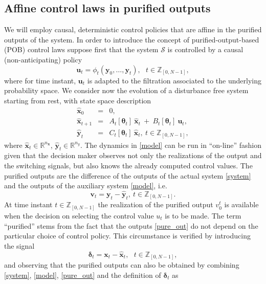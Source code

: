 \documentclass[letterpaper,11pt]{article}
\begin{document}
\subsection{Affine control laws in purified outputs}

We will employ causal, deterministic control policies that are affine in the purified outputs of the system.  In order to introduce  the concept of 
purified-output-based (POB) control laws suppose first that the system $\mathcal{S}$ is controlled by a causal (non-anticipating) policy
$$
\mathbf{u}_t = \phi_t( \mathbf{y}_0, \hdots, \mathbf{y}_t), ~~~t  \in \mathbb{Z}_{[0,N-1]},
$$
where for time instant, $\mathbf{u}_t$ is adapted to the filtration
associated to the underlying probability space. 
We consider now the evolution of a disturbance free system starting from rest, with 
state space description
\begin{eqnarray}
	\label{model}
	\nonumber
	\hat{\mathbf{x}}_0 & = & 0, \\
	\nonumber
	\hat{\mathbf{x}}_{t+1} & = &  A_t[\bm{\theta}_t] ~ \hat{\mathbf{x}}_t ~ + ~ B_t[\bm{\theta}_t] ~ \mathbf{u}_t, \\
	\hat{\mathbf{y}}_t  & = & C_t[\bm{\theta}_t] ~ \hat{\mathbf{x}}_t,  ~  t \in  \mathbb{Z}_{[0,N-1]},
\end{eqnarray}
where $ \hat{\mathbf{x}}_t \in \mathbb{R}^{n_\mathbf{x}}$, $\hat{\mathbf{y}}_t \in \mathbb{R}^{n_y}$.
The dynamics in \eqref{model} can be run in ``on-line'' fashion given that 
the decision maker observes not only the realizations of the output and the switching signals,  
but also knows the already computed control values.  
The purified outputs are the difference of the outputs of the actual system \eqref{system} and the outputs of the auxiliary 
system \eqref{model}, i.e. 
\begin{equation}
	\label{pure_out}
	\mathbf{v}_t = \mathbf{y}_t - \hat{\mathbf{y}}_t , ~  t \in  \mathbb{Z}_{[0,N-1]}.
\end{equation}
At time instant $t \in \mathbb{Z}_{[0,N-1]}$ the realization of the purified output 
$v_0^t$ is available when the decision on selecting the control value $u_t$ is to be made. 
The term ``purified'' stems from the fact that the outputs \eqref{pure_out} 
do not depend on the particular choice of control policy.  This circumstance is verified by introducing the signal 
$$
\bm{\delta}_t = \mathbf{\mathbf{x}}_t - \hat{\mathbf{x}}_t,~~~t \in  \mathbb{Z}_{[0,N-1]},
$$
and observing that the purified outputs can also be obtained 
by combining \eqref{system}, \eqref{model}, \eqref{pure_out} and the definition of $\bm{\delta}_t$ as 
\end{document}
